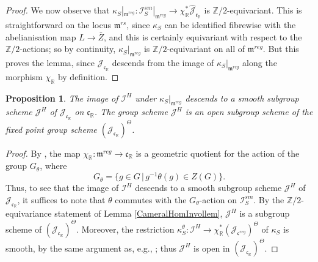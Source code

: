 \documentclass{amsart}
\newtheorem{proposition}[theorem]{Proposition}
\theoremstyle{remark}
\numberwithin{theorem}{section}
\numberwithin{equation}{section}
\begin{document}
\begin{proof}
We now observe that $\kappa_S|_{\mathfrak{m}^{reg}}: \mathcal I^{sm}_S|_{\mathfrak{m}^{reg}} \rightarrow \chi_\mathbb{R}^*\hat{\mathcal J}_{\mathfrak{c}_\mathbb{R}}$ is $\mathbb{Z}/2$-equivariant. This is straightforward on the locus $\mathfrak{m}^{rs}$, since $\kappa_S$ can be identified fibrewise with the abelianisation map $L \rightarrow \bar{Z}$, and this is certainly equivariant with respect to the $\mathbb{Z}/2$-actions; so by continuity, $\kappa_S|_{\mathfrak{m}^{reg}}$ is $\mathbb{Z}/2$-equivariant on all of $\mathfrak{m}^{reg}$. But this proves the lemma, since $\mathcal J_{\mathfrak{c}_\mathbb{R}}$ descends from the image of $\kappa_S|_{\mathfrak{m}^{reg}}$ along the morphism $\chi_\mathbb{R}$ by definition.
\end{proof}

\begin{proposition}\label{HCameralgpprp}
    The image of $\mathcal I^H$ under $\kappa_S|_{\mathfrak{m}^{reg}}$ descends to a smooth subgroup scheme $\mathcal J^H$ of $\mathcal J_{\mathfrak{c}_\mathbb{R}}$ on $\mathfrak{c}_{\mathbb{R}}$. The group scheme $\mathcal J^H$ is an open subgroup scheme of the fixed point group scheme $(\mathcal J_{\mathfrak{c}_\mathbb{R}})^\Theta$.
\end{proposition}

\begin{proof} 
By \cite[Theorem 9]{KR}, the map $\chi_\mathbb{R}:\mathfrak{m}^{reg} \rightarrow \mathfrak{c}_{\mathbb{R}}$ is a geometric quotient for the action of the group $G_\theta$, where
\begin{equation}\label{HCameralgpeqn}
    G_\theta = \{ g \in G \, | \, g^{-1}\theta(g) \in Z(G)\}.
\end{equation}
Thus, to see that the image of $\mathcal I^H$ descends to a smooth subgroup scheme $\mathcal J^H$ of $\mathcal J_{\mathfrak{c}_{\mathbb{R}}}$, it suffices to note that $\theta$ commutes with the $G_\theta$-action on $\mathcal I_S^{sm}$. By the $\mathbb{Z}/2$-equivariance statement of Lemma \ref{CameralHomInvollem}, $\mathcal J^H$ is a subgroup scheme of $(\mathcal J_{\mathfrak{c}_\mathbb{R}})^\Theta$. Moreover, the restriction $\kappa_S^\theta:\mathcal I^H \rightarrow \chi_\mathbb{R}^*(\mathcal J_{\mathfrak{c}^{reg}})^\Theta$ of $\kappa_S$ is smooth, by the same argument as, e.g., \cite[Lemme 2.4.1]{Ngo2}; thus $\mathcal J^H$ is open in $(\mathcal J_{\mathfrak{c}_\mathbb{R}})^\Theta$.
\end{proof}
\end{document}
